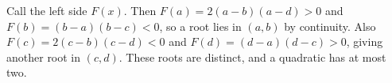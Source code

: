 Call the left side $F(x)$. Then $F(a)=2(a-b)(a-d)>0$ and $F(b)=(b-a)(b-c)<0$, so a root lies in $(a,b)$ by continuity. Also $F(c)=2(c-b)(c-d)<0$ and $F(d)=(d-a)(d-c)>0$, giving another root in $(c,d)$. These roots are distinct, and a quadratic has at most two.

